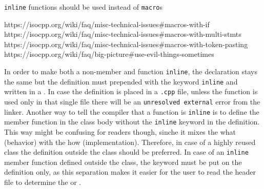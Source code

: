 \texttt{inline} functions should be used instead of \texttt{macro}s

https://isocpp.org/wiki/faq/misc-technical-issues\#macros-with-if \\
https://isocpp.org/wiki/faq/misc-technical-issues\#macros-with-multi-stmts \\
https://isocpp.org/wiki/faq/misc-technical-issues\#macros-with-token-pasting \\
https://isocpp.org/wiki/faq/big-picture\#use-evil-things-sometimes

In order to make both a non-member and function \texttt{inline}, the 
declaration stays the same but the definition must prepended with 
the keyword \texttt{inline} and written in a . 
In case the definition is placed in a \texttt{.cpp} file, unless the 
function is used only in that single file there will be an 
\texttt{unresolved external} error from the linker.
\newline
Another way to tell the compiler that a function is \texttt{inline} is 
to define the member function in the class body without the \texttt{inline} 
keyword in the definition. This way might be confusing 
for readers though, sinche it mixes the what (behavior) with the how 
(implementation). Therefore, in case of a highly reused class the 
definition outside the class should be preferred.
\newline
In case of an \texttt{inline} member function defined outside the class, 
the keyword must be put on the definition only, as this separation makes 
it easier for the user to read the header file to determine the 
 or .

